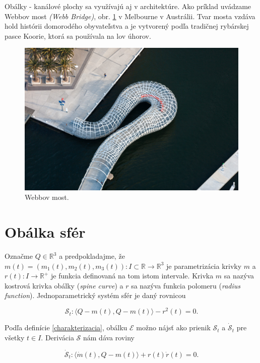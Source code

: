 Obálky - kanálové plochy sa využívajú aj v architektúre. Ako príklad uvádzame Webbov most \textit{(Webb Bridge)}, obr. \ref{fig:webb_bridge} v Melbourne v Austrálii. Tvar mosta vzdáva hold histórii domorodého obyvateľstva a je vytvorený podľa tradičnej rybárskej pasce Koorie, ktorá sa používala na lov úhorov.

\begin{figure}[h!]
	\centering
	\includegraphics[width=\textwidth]{images/webbbridge.jpg}
	\caption[Webbov most.]{Webbov most. \cite{WebbBridge}}
	\label{fig:webb_bridge}
\end{figure}

\section{Obálka sfér}
Označme $Q \in \mathbb{R}^3$ a predpokladajme, že $m(t) = (m_1(t), m_2(t), m_3(t)) \colon I \subset \mathbb{R} \rightarrow \mathbb{R}^3$ je parametrizácia krivky $m$ a $r(t) \colon I \rightarrow \mathbb{R}^{+}$ je funkcia definovaná na tom istom intervale. Krivka $m$ sa nazýva kostrová krivka obálky (\textit{spine curve}) a $r$ sa nazýva funkcia polomeru (\textit{radius function}). Jednoparametrický systém sfér je daný rovnicou

$$
\mathcal{S}_t \colon \langle Q - m(t), Q - m(t) \rangle - r^2(t)= 0.
$$

Podľa definície \ref{charakterizacia}, obálku $\mathcal{E}$ možno nájsť ako prienik $\mathcal{S}_t$ a $\mathcal{\dot{S}}_t$ pre všetky $t \in I$. Derivácia $\mathcal{S}$ nám dáva roviny

$$
\mathcal{\dot{S}}_t \colon \langle \dot{m}(t), Q - m(t) \rangle + r(t) \dot{r}(t) = 0.
$$

